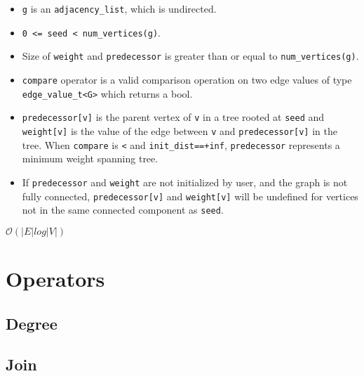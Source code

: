 {\small
      
}
\begin{itemdescr}
      \pnum\preconditions
      \begin{itemize}
            \item
                  \lstinline{g} is an \lstinline{adjacency_list}, which is undirected.
            \item
                  \lstinline{0 <= seed < num_vertices(g)}.
            \item
                  Size of \lstinline{weight} and \lstinline{predecessor} is greater than or equal to \lstinline{num_vertices(g)}.
            \item
                  \lstinline{compare} operator is a valid comparison operation on two edge values of type \lstinline{edge_value_t<G>} which returns a bool.
      \end{itemize}
      \pnum\effects
      \begin{itemize}
            \item
                  \lstinline{predecessor[v]} is the parent vertex of \lstinline{v} in a tree rooted at \lstinline{seed} and \lstinline{weight[v]} is the value of the edge between \lstinline{v} and \lstinline{predecessor[v]} in the tree. When \lstinline{compare} is \lstinline{<} and \lstinline{init_dist==+inf}, \lstinline{predecessor} represents a minimum weight spanning tree.
            \item
                  If \lstinline{predecessor} and \lstinline{weight} are not initialized by user, and the graph is not fully connected, \lstinline{predecessor[v]} and \lstinline{weight[v]} will be undefined for vertices not in the same connected component as \lstinline{seed}.
      \end{itemize}

      \pnum\complexity $\mathcal{O}(|E|log|V|)$
\end{itemdescr}

\section{Operators}
\subsection{Degree}

\subsection{Join}

